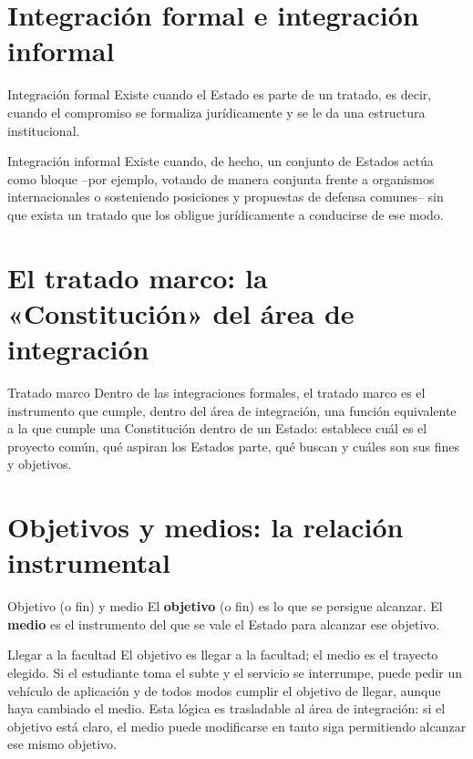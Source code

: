 \documentclass[12pt,oneside]{book}
\begin{document}
\section{Integración formal e integración informal}

\begin{definicion}{Integración formal}
Existe cuando el Estado es parte de un tratado, es decir, cuando el compromiso se formaliza jurídicamente y se le da una estructura institucional.
\end{definicion}

\begin{definicion}{Integración informal}
Existe cuando, de hecho, un conjunto de Estados actúa como bloque --por ejemplo, votando de manera conjunta frente a organismos internacionales o sosteniendo posiciones y propuestas de defensa comunes-- sin que exista un tratado que los obligue jurídicamente a conducirse de ese modo.
\end{definicion}

\section{El tratado marco: la «Constitución» del área de integración}

\begin{definicion}{Tratado marco}
Dentro de las integraciones formales, el tratado marco es el instrumento que cumple, dentro del área de integración, una función equivalente a la que cumple una Constitución dentro de un Estado: establece cuál es el proyecto común, qué aspiran los Estados parte, qué buscan y cuáles son sus fines y objetivos.
\end{definicion}

\section{Objetivos y medios: la relación instrumental}

\begin{definicion}{Objetivo (o fin) y medio}
El \textbf{objetivo} (o fin) es lo que se persigue alcanzar. El \textbf{medio} es el instrumento del que se vale el Estado para alcanzar ese objetivo.
\end{definicion}

\begin{ejemplo}{Llegar a la facultad}
El objetivo es llegar a la facultad; el medio es el trayecto elegido. Si el estudiante toma el subte y el servicio se interrumpe, puede pedir un vehículo de aplicación y de todos modos cumplir el objetivo de llegar, aunque haya cambiado el medio. Esta lógica es trasladable al área de integración: si el objetivo está claro, el medio puede modificarse en tanto siga permitiendo alcanzar ese mismo objetivo.
\end{ejemplo}
\end{document}

